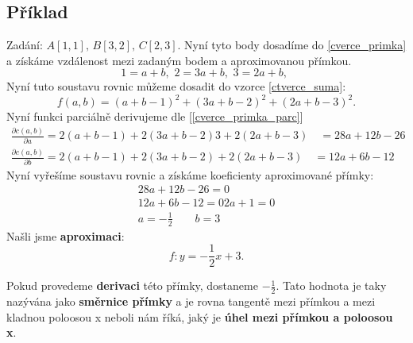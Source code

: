 \subsection*{Příklad}
Zadání: $A[1,1], \, B[3,2], \, C[2,3].$ Nyní tyto body dosadíme do \eqref{cverce_primka} a získáme vzdálenost mezi zadaným bodem a aproximovanou přímkou.
\begin{equation*}
    1 = a + b,\,\, 2 = 3a + b,\,\, 3 = 2a + b, \,\,
\end{equation*}
Nyní tuto soustavu rovnic můžeme dosadit do vzorce \eqref{ctverce_suma}:
\begin{equation*}
    f(a,b) = (a + b - 1)^2 + (3a + b - 2)^2 + (2a + b - 3)^2.
\end{equation*}
Nyní funkci parciálně derivujeme dle [\ref{cverce_primka_parc}]
\begin{equation*}
    \begin{array}{c}
        \frac{\partial c(a,b)}{\partial a} =  2(a + b - 1) + 2(3a + b - 2)3 + 2(2a + b - 3) \quad = 28a + 12b - 26 \\
        \frac{\partial c(a,b)}{\partial b} =  2(a + b - 1) + 2(3a + b - 2) + 2(2a + b - 3)  \quad = 12a + 6b - 12
    \end{array}
\end{equation*}
Nyní vyřešíme soustavu rovnic a získáme koeficienty aproximované přímky:
\begin{equation*}
    \begin{array}{c}
        28a + 12b - 26 = 0 \\
        12a + 6b - 12 = 0
        2a+1 = 0           \\
        a = - \frac{1}{2} \quad \quad b = 3
    \end{array}
\end{equation*}
Našli jsme \textbf{aproximaci}:
\begin{equation*}
    f : y = - \frac{1}{2} x + 3.
\end{equation*}

Pokud provedeme \textbf{derivaci} této přímky, dostaneme  $-\frac{1}{2}$. Tato hodnota je taky nazývána jako \textbf{směrnice přímky} a je rovna tangentě mezi přímkou a mezi kladnou poloosou x neboli nám říká, jaký je \textbf{úhel mezi přímkou a poloosou x}.

